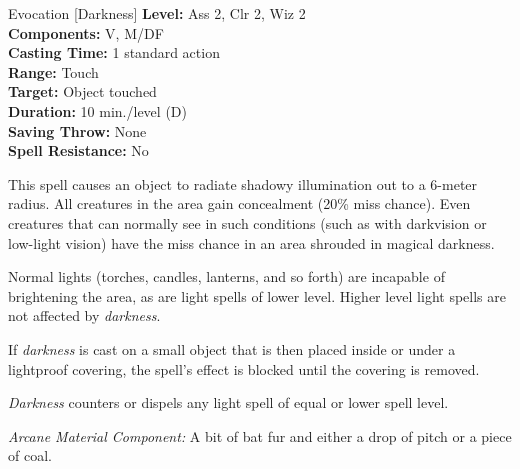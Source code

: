 {Evocation [Darkness]}
{
	\textbf{Level:}
	Ass 2, Clr 2, Wiz 2\\
	\textbf{Components:}
	V, M/DF\\
	\textbf{Casting Time:}
	1 standard action\\
	\textbf{Range:}
	Touch\\
	\textbf{Target:}
	Object touched\\
	\textbf{Duration:}
	10 min./level (D)\\
	\textbf{Saving Throw:}
	None\\
	\textbf{Spell Resistance:}
	No\\
}
{
	This spell causes an object to radiate shadowy illumination out to a 6-meter radius. All creatures in the area gain concealment (20\% miss chance). Even creatures that can normally see in such conditions (such as with darkvision or low-light vision) have the miss chance in an area shrouded in magical darkness.

	Normal lights (torches, candles, lanterns, and so forth) are incapable of brightening the area, as are light spells of lower level. Higher level light spells are not affected by \emph{darkness}.

	If \emph{darkness} is cast on a small object that is then placed inside or under a lightproof covering, the spell's effect is blocked until the covering is removed.

	\emph{Darkness} counters or dispels any light spell of equal or lower spell level.

	\textit{Arcane Material Component:}
	A bit of bat fur and either a drop of pitch or a piece of coal.

}
